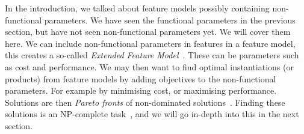 In the introduction, we talked about feature models possibly containing 
non-functional parameters. We have seen the functional parameters in the
previous section, but have not seen non-functional parameters yet. We will
cover them here. We can include non-functional parameters in features in a
feature model, this creates a so-called
\emph{Extended Feature Model}~\cite{benavides2005extfms}. These can be
parameters such as cost and performance. We may then want to find optimal
instantiations (or products) from feature models by adding objectives to
the non-functional parameters. For example by minimising cost, or maximising
performance. Solutions are then \emph{Pareto fronts} of non-dominated
solutions~\cite{horcas2022breakit}. Finding these solutions is an NP-complete
task~\cite{ochoa2018npcomplete}, and we will go in-depth into this in the next
section.
